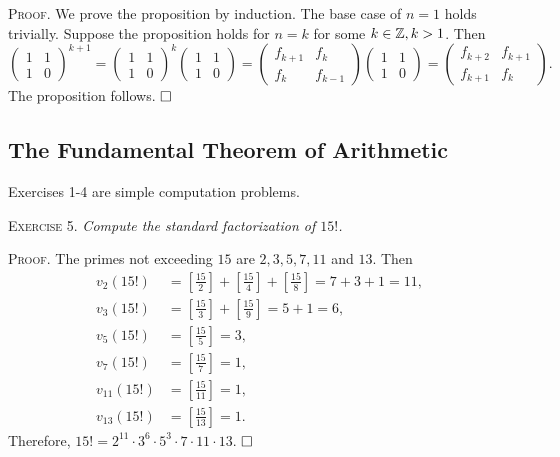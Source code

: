 \documentclass[11pt, leqno]{article}
\newcommand{\done}{\ensuremath{\hfill\square}}
\begin{document}
\textsc{Proof}. We prove the proposition by induction. The base case of $n=1$ holds trivially. Suppose the proposition holds for $n=k$ for some $k\in\mathbb{Z}, k>1$. Then 
\begin{displaymath}
\begin{pmatrix} 1 & 1 \\ 1 & 0 \end{pmatrix}^{k+1} = \begin{pmatrix} 1 & 1 \\ 1 & 0 \end{pmatrix}^k \begin{pmatrix} 1 & 1 \\ 1 & 0 \end{pmatrix} = \begin{pmatrix} f_{k+1} & f_k \\ f_k & f_{k-1} \end{pmatrix} \begin{pmatrix} 1 & 1 \\ 1 & 0 \end{pmatrix} = \begin{pmatrix} f_{k+2} & f_{k+1} \\ f_{k+1} & f_k \end{pmatrix}.
\end{displaymath}
The proposition follows. \done

\subsection{The Fundamental Theorem of Arithmetic}

Exercises 1-4 are simple computation problems.

\textsc{Exercise 5}. \emph{Compute the standard factorization of $15!$.}

\textsc{Proof}. The primes not exceeding $15$ are $2, 3, 5, 7, 11 $ and $13$. Then 
\begin{align*}
  v_2(15!) &= \left[\frac{15}{2}\right] + \left[\frac{15}{4}\right] + \left[\frac{15}{8}\right] = 7 + 3 + 1 = 11, \\
  v_3(15!) &= \left[\frac{15}{3}\right] + \left[\frac{15}{9}\right] = 5 + 1 = 6,\\
  v_5(15!) &= \left[\frac{15}{5}\right] = 3, \\
  v_7(15!) &= \left[\frac{15}{7}\right] = 1, \\
  v_{11}(15!) &= \left[\frac{15}{11}\right] = 1, \\
  v_{13}(15!) &= \left[\frac{15}{13}\right] = 1.
\end{align*}
Therefore, $15! = 2^{11}\cdot 3^6\cdot 5^3\cdot 7 \cdot 11 \cdot 13$. \done
\end{document}
